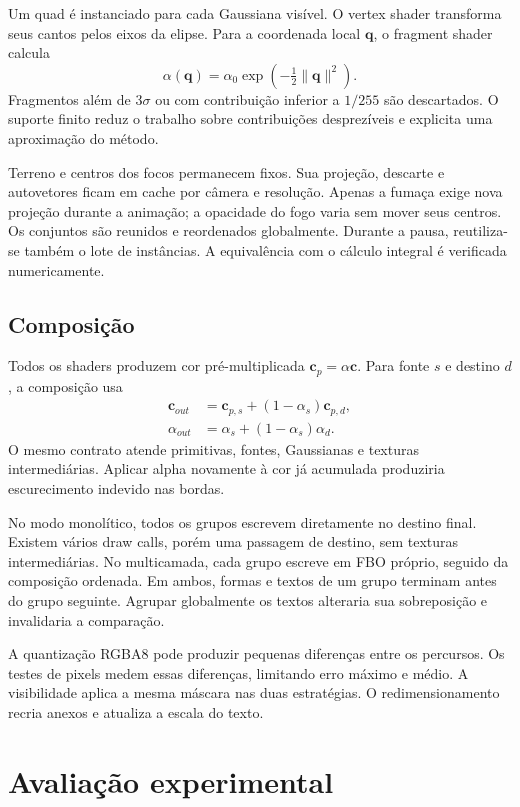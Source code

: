 \documentclass[conference]{IEEEtran}
\begin{document}
Um quad é instanciado para cada Gaussiana visível. O vertex shader transforma seus cantos pelos eixos da elipse. Para a coordenada local $\mathbf{q}$, o fragment shader calcula
\begin{equation}
\alpha(\mathbf{q})=\alpha_0\exp\left(-\tfrac12\|\mathbf{q}\|^2\right).
\end{equation}
Fragmentos além de $3\sigma$ ou com contribuição inferior a $1/255$ são descartados. O suporte finito reduz o trabalho sobre contribuições desprezíveis e explicita uma aproximação do método.

Terreno e centros dos focos permanecem fixos. Sua projeção, descarte e autovetores ficam em cache por câmera e resolução. Apenas a fumaça exige nova projeção durante a animação; a opacidade do fogo varia sem mover seus centros. Os conjuntos são reunidos e reordenados globalmente. Durante a pausa, reutiliza-se também o lote de instâncias. A equivalência com o cálculo integral é verificada numericamente.

\subsection{Composição}
Todos os shaders produzem cor pré-multiplicada $\mathbf{c}_p=\alpha\mathbf{c}$. Para fonte $s$ e destino $d$, a composição usa
\begin{align}
\mathbf{c}_{out}&=\mathbf{c}_{p,s}+(1-\alpha_s)\mathbf{c}_{p,d},\\
\alpha_{out}&=\alpha_s+(1-\alpha_s)\alpha_d.
\end{align}
O mesmo contrato atende primitivas, fontes, Gaussianas e texturas intermediárias. Aplicar alpha novamente à cor já acumulada produziria escurecimento indevido nas bordas.

No modo monolítico, todos os grupos escrevem diretamente no destino final. Existem vários draw calls, porém uma passagem de destino, sem texturas intermediárias. No multicamada, cada grupo escreve em FBO próprio, seguido da composição ordenada. Em ambos, formas e textos de um grupo terminam antes do grupo seguinte. Agrupar globalmente os textos alteraria sua sobreposição e invalidaria a comparação.

A quantização RGBA8 pode produzir pequenas diferenças entre os percursos. Os testes de pixels medem essas diferenças, limitando erro máximo e médio. A visibilidade aplica a mesma máscara nas duas estratégias. O redimensionamento recria anexos e atualiza a escala do texto.

\section{Avaliação experimental}
\end{document}
